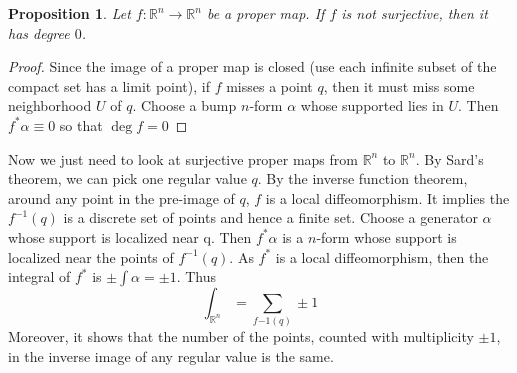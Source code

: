 \documentclass{article}
\newtheorem{proposition}{Proposition}[section]
\begin{document}
\begin{proposition}
    Let  $ f:\mathbb{R}^n\rightarrow\mathbb{R }^n $ be a proper map. If  $ f  $ is not surjective, then it has degree  $ 0 $. 
\end{proposition}
\begin{proof}
    Since the image of a proper map is closed (use each infinite subset of the compact set has a limit point), if  $ f  $ misses a point  $ q  $, then it must miss some neighborhood  $ U $ of  $ q $. Choose a bump  $ n $-form   $ \alpha  $ whose supported lies in  $ U  $. Then  $ f^*\alpha\equiv 0  $ so that  $ \deg f=0 $ 
\end{proof}
Now we just need to look at surjective proper maps from  $ \mathbb{R }^n  $ to  $ \mathbb{R}^n $. By Sard's theorem, we can pick one regular value  $ q $. By the inverse function theorem, around any point in the pre-image of  $ q  $,  $ f  $ is a local diffeomorphism. It implies the  $ f^{-1}(q) $ is a discrete set of points and hence a finite set. Choose a generator  $ \alpha  $ whose support is localized near q. Then  $ f^*\alpha  $ is a  $ n  $-form whose support is localized near the points of  $ f^{-1}(q) $. As  $ f^*  $ is a local diffeomorphism, then the integral of  $ f^*  $ is   $ \pm \int\alpha=\pm 1 $.
Thus 
\[\int_{\mathbb{R }^n}=\sum\limits_{f{-1}(q)}\pm 1  \]
Moreover, it shows that the number of the points, counted with multiplicity  $ \pm 1 $, in the inverse image of any regular value is the same.
\end{document}
